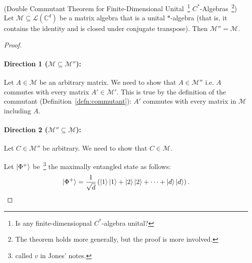 \begin{lemma}(Double Commutant Theorem for Finite-Dimensional Unital~\footnote{Is any finite-dimensiopnal $C^*$-algebra unital?} $C^*$-Algebras~\footnote{The theorem holds more generally, but the proof is more involved.})
    Let $\mathcal{M} \subseteq \mathcal{L}(\mathbb{C}^d)$ be a matrix algebra that is a unital $*$-algebra (that is, it contains the identity and is closed under conjugate transpose). Then $\mathcal{M}'' = \mathcal{M}$.
\end{lemma}
\begin{proof}



    \paragraph{Direction 1 ($\mathcal{M} \subseteq \mathcal{M}''$):} 
    Let $A \in \mathcal{M}$ be an arbitrary matrix. We need to show that $A \in \mathcal{M}''$ i.e. $A$ commutes with every matrix $A' \in \mathcal{M}'$. This is true by the definition of the commutant (Definition~\ref{defn:commutant}): $A'$ commutes with every matrix in $\mathcal{M}$ including $A$.
    

    \paragraph{Direction 2 ($\mathcal{M}'' \subseteq \mathcal{M}$):} Let $C \in \mathcal{M}''$ be arbitrary. We need to show that $C \in \mathcal{M}$. 
    
Let $\ket{\Phi^+}$ be~\footnote{called $v$ in Jones' notes.} the maximally entangled state as follows:
\begin{equation}
    \ket{\Phi^+} = \frac{1}{\sqrt{d}} \left(\ket{1}\ket{1} + \ket{2}\ket{2} + \dots + \ket{d}\ket{d}\right).
\end{equation}


\end{proof}
